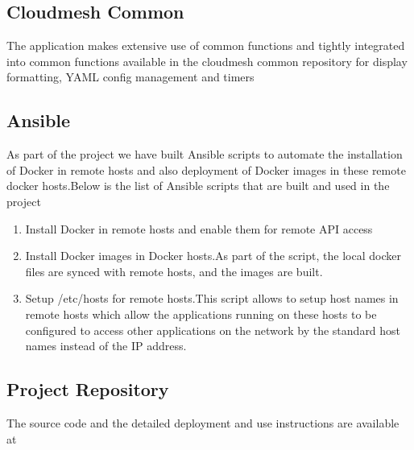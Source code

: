 \documentclass[9pt,twocolumn,twoside]{../../styles/osajnl}
\begin{document}
\subsection{Cloudmesh Common}

The application makes extensive use of common functions and tightly integrated into common functions available in the cloudmesh common repository for display formatting, YAML config management and timers

\subsection{Ansible}

As part of the project we have built Ansible\cite{www-Ansible} scripts to automate the installation of Docker in remote hosts and also deployment of Docker images in these remote docker hosts.Below is the list of Ansible scripts that are built and used in the project 
\begin{enumerate}
\item Install Docker in remote hosts and enable them for remote API access
\item Install Docker images in Docker hosts.As part of the script, the local docker files are synced with remote hosts, and the images are built.
\item Setup /etc/hosts for remote hosts.This script allows to setup host names in remote hosts which allow the applications running on these hosts to be configured to access other applications on the network by the standard host names instead of the IP address.
\end{enumerate}

\subsection{Project Repository}

The source code and the detailed deployment and use instructions are available at \cite{github-Cloudmesh-Docker} 
\end{document}

